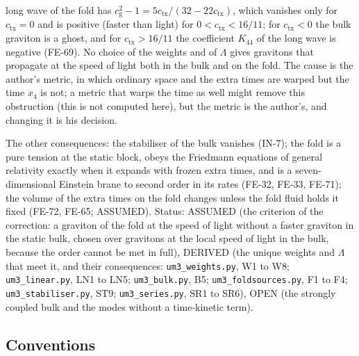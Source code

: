 \documentclass[
  10pt,
]{article}
\begin{document}
\begin{itemize}
  long wave of the fold has
  \(c_{\mathrm{g}}^2 - 1 = 5c_{\mathrm{tx}}/(32 - 22c_{\mathrm{tx}})\),
  which vanishes only for \(c_{\mathrm{tx}} = 0\) and is positive
  (faster than light) for \(0 < c_{\mathrm{tx}} < 16/11\); for
  \(c_{\mathrm{tx}} < 0\) the bulk graviton is a ghost, and for
  \(c_{\mathrm{tx}} > 16/11\) the coefficient \(K_{44}\) of the long
  wave is negative (FE-69). No choice of the weights and of \(\Lambda\)
  gives gravitons that propagate at the speed of light both in the bulk
  and on the fold. The cause is the author's metric, in which ordinary
  space and the extra times are warped but the time \(x_4\) is not; a
  metric that warps the time as well might remove this obstruction (this
  is not computed here), but the metric is the author's, and changing it
  is his decision.
\end{itemize}

The other consequences: the stabiliser of the bulk vanishes (IN-7); the
fold is a pure tension at the static block, obeys the Friedmann
equations of general relativity exactly when it expands with frozen
extra times, and is a seven-dimensional Einstein brane to second order
in its rates (FE-32, FE-33, FE-71); the volume of the extra times on the
fold changes unless the fold fluid holds it fixed (FE-72, FE-65;
ASSUMED). Status: ASSUMED (the criterion of the correction: a graviton
of the fold at the speed of light without a faster graviton in the
static bulk, chosen over gravitons at the local speed of light in the
bulk, because the order cannot be met in full), DERIVED (the unique
weights and \(\Lambda\) that meet it, and their consequences:
\texttt{um3\_weights.py}, W1 to W8; \texttt{um3\_linear.py}, LN1 to LN5;
\texttt{um3\_bulk.py}, B5; \texttt{um3\_foldsources.py}, F1 to F4;
\texttt{um3\_stabiliser.py}, ST9; \texttt{um3\_series.py}, SR1 to SR6),
OPEN (the strongly coupled bulk and the modes without a time-kinetic
term).

\hypertarget{conventions}{%
\subsection{Conventions}\label{conventions}}
\end{document}
